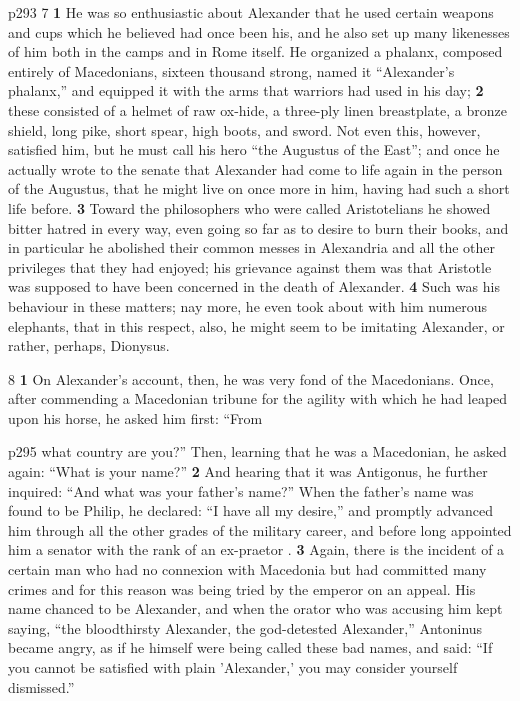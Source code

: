 p293
7 \textbf{1} He was so enthusiastic about Alexander that he used certain weapons and cups which he believed had once been his, and he also set up many likenesses of him both in the camps and in Rome itself. He organized a phalanx, composed entirely of Macedonians, sixteen thousand strong, named it ``Alexander's phalanx,'' and equipped it with the arms that warriors had used in his day; \textbf{2} these consisted of a helmet of raw ox-hide, a three-ply linen breastplate, a bronze shield, long pike, short spear, high boots, and sword. Not even this, however, satisfied him, but he must call his hero ``the Augustus of the East''; and once he actually wrote to the senate that Alexander had come to life again in the person of the Augustus, that he might live on once more in him, having had such a short life before. \textbf{3} Toward the philosophers who were called Aristotelians he showed bitter hatred in every way, even going so far as to desire to burn their books, and in particular he abolished their common messes in Alexandria and all the other privileges that they had enjoyed; his grievance against them was that Aristotle was supposed to have been concerned in the death of Alexander. \textbf{4} Such was his behaviour in these matters; nay more, he even took about with him numerous elephants, that in this respect, also, he might seem to be imitating Alexander, or rather, perhaps, Dionysus.

8 \textbf{1} On Alexander's account, then, he was very fond of the Macedonians. Once, after commending a Macedonian tribune for the agility with which he had leaped upon his horse, he asked him first: ``From

p295 what country are you?'' Then, learning that he was a Macedonian, he asked again: ``What is your name?'' \textbf{2} And hearing that it was Antigonus, he further inquired: ``And what was your father's name?'' When the father's name was found to be Philip, he declared: ``I have all my desire,'' and promptly advanced him through all the other grades of the military career, and before long appointed him a senator with the rank of an ex-praetor . \textbf{3} Again, there is the incident of a certain man who had no connexion with Macedonia but had committed many crimes and for this reason was being tried by the emperor on an appeal. His name chanced to be Alexander, and when the orator who was accusing him kept saying, ``the bloodthirsty Alexander, the god-detested Alexander,'' Antoninus became angry, as if he himself were being called these bad names, and said: ``If you cannot be satisfied with plain 'Alexander,' you may consider yourself dismissed.''

